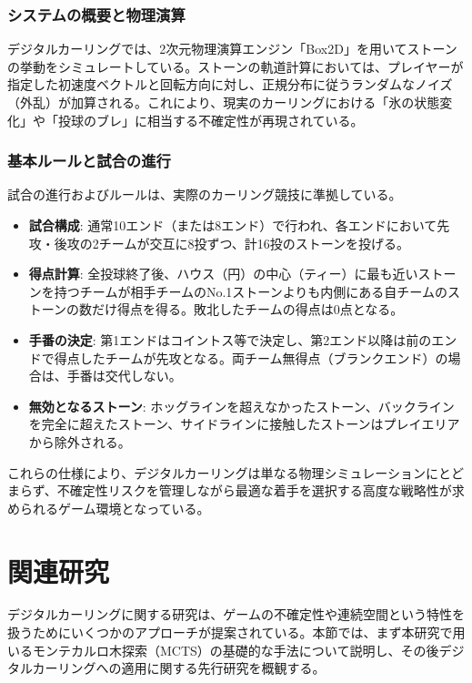 \documentclass[11pt,a4j]{jreport}
\begin{document}
\subsection{システムの概要と物理演算}
デジタルカーリングでは、2次元物理演算エンジン「Box2D」を用いてストーンの挙動をシミュレートしている\cite{digitalcurling_server}。ストーンの軌道計算においては、プレイヤーが指定した初速度ベクトルと回転方向に対し、正規分布に従うランダムなノイズ（外乱）が加算される。これにより、現実のカーリングにおける「氷の状態変化」や「投球のブレ」に相当する不確定性が再現されている\cite{kato2016}。

\subsection{基本ルールと試合の進行}
試合の進行およびルールは、実際のカーリング競技に準拠している\cite{digitalcurling_server, kato2016}。
\begin{itemize}
    \item \textbf{試合構成}: 通常10エンド（または8エンド）で行われ、各エンドにおいて先攻・後攻の2チームが交互に8投ずつ、計16投のストーンを投げる。
    \item \textbf{得点計算}: 全投球終了後、ハウス（円）の中心（ティー）に最も近いストーンを持つチームが相手チームのNo.1ストーンよりも内側にある自チームのストーンの数だけ得点を得る。敗北したチームの得点は0点となる。
    \item \textbf{手番の決定}: 第1エンドはコイントス等で決定し、第2エンド以降は前のエンドで得点したチームが先攻となる。両チーム無得点（ブランクエンド）の場合は、手番は交代しない。
    \item \textbf{無効となるストーン}: ホッグラインを超えなかったストーン、バックラインを完全に超えたストーン、サイドラインに接触したストーンはプレイエリアから除外される。
\end{itemize}

これらの仕様により、デジタルカーリングは単なる物理シミュレーションにとどまらず、不確定性リスクを管理しながら最適な着手を選択する高度な戦略性が求められるゲーム環境となっている。

\chapter[関連研究]{関連研究}
\label{chap:related_work}
デジタルカーリングに関する研究は、ゲームの不確定性や連続空間という特性を扱うためにいくつかのアプローチが提案されている。本節では、まず本研究で用いるモンテカルロ木探索（MCTS）の基礎的な手法について説明し、その後デジタルカーリングへの適用に関する先行研究を概観する。
\end{document}
